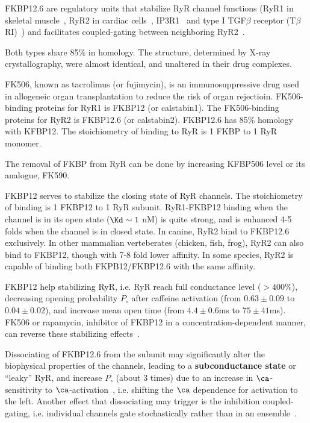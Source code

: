 FKBP12.6 are regulatory units that stabilize RyR channel functions (RyR1 in
skeletal muscle~\citep{brillantes1994}, RyR2 in cardiac
cells~\citep{Kaftan1996}, IP3R1~\citep{Cameron1997} and type I TGF$\beta$
receptor (T$\beta$RI)~\citep{Chen1997}) and facilitates coupled-gating between
neighboring RyR2~\citep{marx1998}.


Both types share 85\% in homology. The structure, determined by X-ray
crystallography, were almost identical, and unaltered in their drug complexes.

\begin{framed}
  FK506, known as tacrolimus (or fujimycin), is an immunosuppressive
  drug used in allogeneic organ transplantation to reduce the risk of
  organ rejectioin.  FK506-binding proteins for RyR1 is FKBP12 (or
  calstabin1). The FK506-binding proteins for RyR2 is FKBP12.6 (or
  calstabin2). FKBP12.6 has 85\% homology with KFBP12. The
  stoichiometry of binding to RyR is 1 FKBP to 1 RyR monomer. 

  The removal of FKBP from RyR can be done by increasing KFBP506 level
  or its analogue, FK590. 
\end{framed}

FKBP12 serves to stabilize the closing state of RyR channels. The stoichiometry
of binding is 1 FKBP12 to 1 RyR subunit. RyR1-FKBP12 binding when the channel is
in its open state ($\Kd \sim 1$ nM) is quite strong, and is enhanced 4-5 folds
when the channel is in closed state. In canine, RyR2 bind to FKBP12.6
exclusively. In other mammalian verteberates (chicken, fish, frog), RyR2 can
also bind to FKBP12, though with 7-8 fold lower affinity. In some species, RyR2
is capable of binding both FKPB12/FKBP12.6 with the same affinity.

FKBP12 help stabilizing RyR, i.e. RyR reach full conductance level
($> 400\%$), decreasing opening probability $P_\circ$ after caffeine
activation (from $0.63\pm 0.09$ to $0.04\pm 0.02$), and increase
mean open time (from $4.4\pm 0.6$ms to $75\pm 41$ms).  FK506 or
rapamycin, inhibitor of FKBP12 in a concentration-dependent manner,
can reverse these stabilizing effects~\citep{brillantes1994}.

Dissociating of FKBP12.6 from the subunit may significantly alter the
biophysical properties of the channels, leading to a
{\bf subconductance state} or ``leaky'' RyR, and increase $P_\circ$
(about 3 times) due to an increase in $\ca$-sensitivity to
$\ca$-activation~\citep{Kaftan1996}, i.e. shifting the $\ca$
dependence for activation to the left.  Another effect that
dissociating may trigger is the inhibition coupled-gating,
i.e. individual channels gate stochastically rather than in an
ensemble~\citep{marx1998}.

